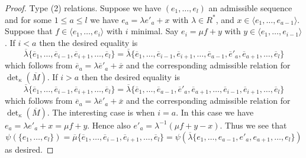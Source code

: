 \begin{proof}
\medskip\noindent
Type (2) relations. Suppose we have $(e_1, \ldots, e_l)$ an
admissible sequence and for some $1 \leq a \leq l$ we have
$e_a = \lambda e'_a + x$ with $\lambda \in R^*$, and
$x \in \langle e_1, \ldots, e_{a - 1}\rangle$.
Suppose that $f \in \langle e_1, \ldots, e_i\rangle$ with $i$ minimal.
Say $e_i = \mu f + y$ with $y \in \langle e_1, \ldots, e_{i - 1}\rangle$.
If $i < a$ then the desired equality is 
$$
\overline{\lambda}
\{\overline{e}_1,
\ldots,
\overline{e}_{i - 1},
\overline{e}_{i + 1},
\ldots,
\overline{e}_l\}
=
\overline{\lambda}
\{\overline{e}_1,
\ldots,
\overline{e}_{i - 1},
\overline{e}_{i + 1},
\ldots,
\overline{e}_{a - 1},
\overline{e}'_a,
\overline{e}_{a + 1},
\ldots,
\overline{e}_l\}
$$
which follows from $\overline{e}_a = \lambda \overline{e}'_a + \overline{x}$
and the corresponding admissible relation for $\det_\kappa(\overline{M})$.
If $i > a$ then the desired equality is 
$$
\overline{\lambda}
\{\overline{e}_1,
\ldots,
\overline{e}_{i - 1},
\overline{e}_{i + 1},
\ldots,
\overline{e}_l\}
=
\overline{\lambda}
\{\overline{e}_1,
\ldots,
\overline{e}_{a - 1},
\overline{e}'_a,
\overline{e}_{a + 1},
\ldots,
\overline{e}_{i - 1},
\overline{e}_{i + 1},
\ldots,
\overline{e}_l\}
$$
which follows from $\overline{e}_a = \lambda \overline{e}'_a + \overline{x}$
and the corresponding admissible relation for $\det_\kappa(\overline{M})$.
The interesting case is when $i = a$. In this case we have
$e_a = \lambda e'_a + x = \mu f + y$. Hence also
$e'_a = \lambda^{-1}(\mu f + y - x)$. Thus we see that
$$
\psi(\{e_1, \ldots, e_l\})
= \overline{\mu}
\{\overline{e}_1, \ldots,
\overline{e}_{i - 1},
\overline{e}_{i + 1}, \ldots, \overline{e}_l\}
=
\psi(
\overline{\lambda}
\{e_1, \ldots, e_{a - 1}, e'_a, e_{a + 1}, \ldots, e_l\}
)
$$
as desired.


\end{proof}
